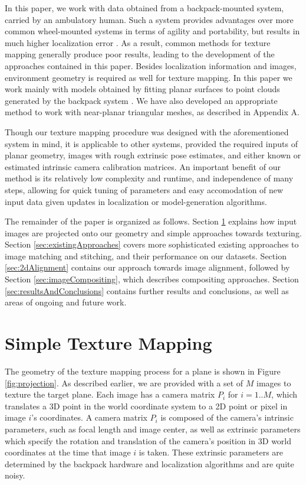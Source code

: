\documentclass[]{spie}  %
\begin{document}
In this paper, we work with data obtained from a backpack-mounted
system, carried by an ambulatory human. Such a system provides
advantages over more common wheel-mounted systems in terms of agility
and portability, but results in much higher localization error
\cite{liu2010indoor}. As a result, common methods for texture mapping
generally produce poor results, leading to the development of the
approaches contained in this paper. Besides localization information
and images, environment geometry is required as well for texture
mapping. In this paper we work mainly with models obtained by fitting
planar surfaces to point clouds generated by the backpack system
\cite{sanchez2012point}. We have also developed an appropriate method
to work with near-planar triangular meshes, as described in Appendix
A.

Though our texture mapping procedure was designed with the
aforementioned system in mind, it is applicable to other systems,
provided the required inputs of planar geometry, images with rough
extrinsic pose estimates, and either known or estimated intrinsic
camera calibration matrices. An important benefit of our method is its
relatively low complexity and runtime, and independence of many
steps, allowing for quick tuning of parameters and easy
accomodation of new input data given updates in localization or
model-generation algorithms.

The remainder of the paper is organized as follows. Section
\ref{sec:simpleTextureMapping} explains how input images are projected
onto our geometry and simple approaches towards texturing. Section
\ref{sec:existingApproaches} covers more sophisticated existing
approaches to image matching and stitching, and their performance on
our datasets. Section \ref{sec:2dAlignment} contains our approach
towards image alignment, followed by Section
\ref{sec:imageCompositing}, which describes compositing
approaches. Section \ref{sec:resultsAndConclusions} contains further
results and conclusions, as well as areas of ongoing and future work.

\section{Simple Texture Mapping}
\label{sec:simpleTextureMapping}

The geometry of the texture mapping process for a plane is shown in
Figure \ref{fig:projection}.  As described earlier, we are provided
with a set of $M$ images to texture the target plane. Each image has a
camera matrix $P_i$ for $i=1..M$, which translates a 3D point in the
world coordinate system to a 2D point or pixel in image $i$'s
coordinates. A camera matrix $P_i$ is composed of the camera's
intrinsic parameters, such as focal length and image center, as well
as extrinsic parameters which specify the rotation and translation of
the camera's position in 3D world coordinates at the time that image
$i$ is taken. These extrinsic parameters are determined by the
backpack hardware and localization algorithms \cite{chen2010indoor,
  liu2010indoor, kua2012loopclosure} and are quite noisy.
\end{document}
